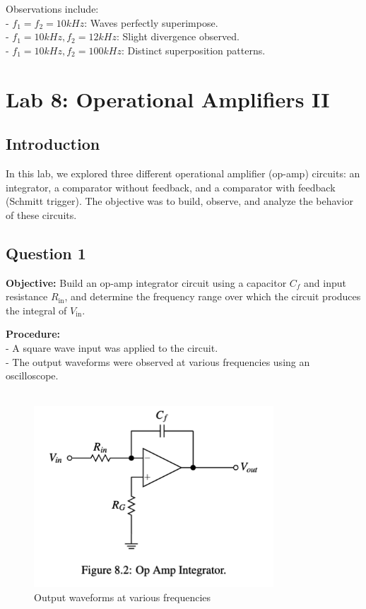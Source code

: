 \documentclass{article}
\begin{document}
Observations include: \\ 
- \( f_1 = f_2 = 10kHz \): Waves perfectly superimpose. \\ 
- \( f_1 = 10kHz, f_2 = 12kHz \): Slight divergence observed.\\
- \( f_1 = 10kHz, f_2 = 100kHz \): Distinct superposition patterns. \\




\section*{Lab 8: Operational Amplifiers II}

\subsection*{Introduction}
In this lab, we explored three different operational amplifier (op-amp) 
circuits: an integrator, a comparator without feedback, and a comparator 
with feedback (Schmitt trigger). The objective was to build, observe, and 
analyze the behavior of these circuits.

\subsection*{Question 1}
\textbf{Objective:} Build an op-amp integrator circuit using a 
capacitor \( C_f \) and input resistance \( R_{\text{in}} \), 
and determine the frequency range over which the circuit produces 
the integral of \( V_{\text{in}} \).

\textbf{Procedure:} \\ 
- A square wave input was applied to the circuit. \\ 
- The output waveforms were observed at various frequencies using an oscilloscope. \\ 
\\ 

\begin{figure}[H]
    \centering
    \includegraphics[width=0.8\textwidth]{img/Lab 8/1_1.png} %
    \caption{Output waveforms at various frequencies}
\end{figure}
\end{document}
